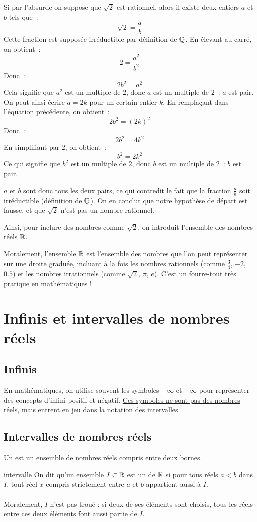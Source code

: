 \begin{demonstration}
    Si par l'absurde on suppose que $\sqrt{2}$ est rationnel, alors il existe deux entiers $a$ et $b$ tels que~:
    $$ \sqrt{2} = \frac{a}{b} $$
    Cette fraction est supposée irréductible par définition de $\mathbb{Q}$. En élevant au carré, on obtient~:
    $$ 2 = \frac{a^2}{b^2} $$
    Donc~:
    $$ 2b^2 = a^2 $$
    Cela signifie que $a^2$ est un multiple de $2$, donc $a$ est un multiple de $2$~: $a$ est pair. On peut ainsi écrire $a = 2k$ pour un certain entier $k$. En remplaçant dans l'équation précédente, on obtient~:
    $$ 2b^2 = (2k)^2 $$
    Donc~:
    $$ 2b^2 = 4k^2 $$
    En simplifiant par $2$, on obtient~:
    $$ b^2 = 2k^2 $$
    Ce qui signifie que $b^2$ est un multiple de $2$, donc $b$ est un multiple de $2$~: $b$ est pair.

    $a$ et $b$ sont donc tous les deux pairs, ce qui contredit le fait que la fraction $\frac{a}{b}$ soit irréductible (définition de $\mathbb{Q}$). On en conclut que notre hypothèse de départ est fausse, et que $\sqrt{2}$ n'est pas un nombre rationnel.
\end{demonstration}

Ainsi, pour inclure des nombres comme $\sqrt{2}$, on introduit l'ensemble des nombres réels $\mathbb{R}$.

\begin{remarque}{}{}
    Moralement, l'ensemble $\mathbb{R}$ est l'ensemble des nombres que l'on peut représenter sur une droite graduée, incluant à la fois les nombres rationnels (comme $\frac{3}{4}$, $-2$, $0.5$) et les nombres irrationnels (comme $\sqrt{2}$, $\pi$, $e$).
    C'est un fourre-tout très pratique en mathématiques !
\end{remarque}

\section{Infinis et intervalles de nombres réels}

\subsection{Infinis}
En mathématiques, on utilise souvent les symboles $+\infty$ et $-\infty$ pour représenter des concepts d'infini positif et négatif. \underline{Ces symboles ne sont pas des nombres réels}, mais entrent en jeu dans la notation des intervalles.

\subsection{Intervalles de nombres réels} 
Un  est un ensemble de nombres réels compris entre deux bornes.
\begin{definition}{}{intervalle}
    On dit qu'un ensemble $I \subset \mathbb{R}$ est un  de $\mathbb{R}$ si pour tous réels $a<b$ dans $I$, tout réel $x$ compris strictement entre $a$ et $b$ appartient aussi à $I$. \\\\Moralement, $I$ n'est pas troué : si deux de ses éléments sont choisis, tous les réels entre ces deux éléments font aussi partie de $I$.
\end{definition}

